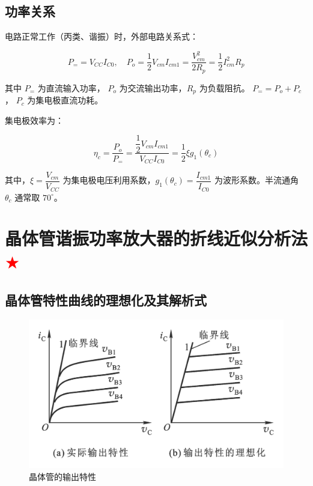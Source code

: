 \subsection{功率关系}

电路正常工作（丙类、谐振）时，外部电路关系式：

\begin{equation}
    P_= = V_{CC} I_{C0}, \quad P_o = \frac{1}{2} V_{cm} I_{cm1} = \frac{V_{cm}^2}{2R_p} = \frac{1}{2} I_{cm}^2 R_p
\end{equation}

其中 $P_=$ 为直流输入功率， $P_o$ 为交流输出功率，$R_p$ 为负载阻抗。 $P_= = P_o + P_c $， $P_c$ 为集电极直流功耗。

集电极效率为：

\begin{equation}
    \eta_c = \frac{P_o}{P_=} = \frac{\dfrac{1}{2} V_{cm} I_{cm1}}{V_{CC} I_{C0}} = \frac{1}{2} \xi g_1(\theta_c)
\end{equation}

其中，$\xi = \dfrac{V_{cm}}{V_{CC}}$ 为集电极电压利用系数，$g_1(\theta_c) = \dfrac{I_{cm1}}{I_{C0}}$ 为波形系数。半流通角 $\theta_c$ 通常取 $70^\circ$。

\section{晶体管谐振功率放大器的折线近似分析法 \textcolor{red}{$\bigstar$}}

\subsection{晶体管特性曲线的理想化及其解析式}

\begin{figure}[htbp]
    \centering
    \includegraphics[scale=0.5]{image/Picture2.png}
    \caption{晶体管的输出特性}
\end{figure}

